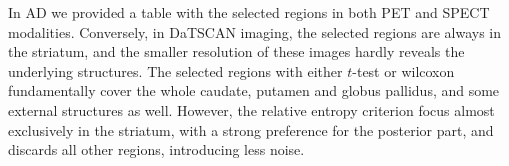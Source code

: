 In \ac{AD} we provided a table with the selected regions in both \ac{PET} and \ac{SPECT} modalities. Conversely, in DaTSCAN imaging, the selected regions are always in the striatum, and the smaller resolution of these images hardly reveals the underlying structures. The selected regions with either $t$-test or wilcoxon fundamentally cover the whole caudate, putamen and globus pallidus, and some external structures as well. However, the relative entropy criterion focus almost exclusively in the striatum, with a strong preference for the posterior part, and discards all other regions, introducing less noise. 

\begin{figure}[bth]
	\myfloatalign
	\quad
	\subfloat[\ac{KL} divergence.]

\end{figure}
